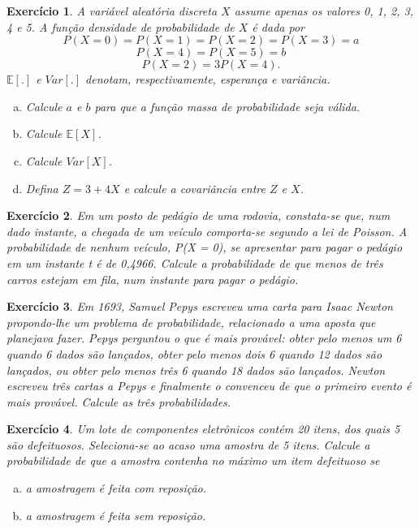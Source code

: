 \documentclass[letter,11pt]{article}
\newtheorem{exer}{Exercício}
\newcommand{\var}{Var}
\newcommand{\E}{\mathbb{E}}
\begin{document}
\medskip
\begin{exer} \rm
A variável aleatória discreta $X$ assume apenas os valores 0, 1, 2, 3, 4 e 5. A função densidade de
probabilidade de $X$ é dada por
\[P (X = 0)=P(X=1)=P(X = 2)= P(X=3)=a\]
\[P(X=4)=P(X=5) = b\]
\[P(X=2)= 3P(X=4).\]
$\E[.]$ e $\var[.]$ denotam, respectivamente, esperança e variância. 
\begin{enumerate}[a)]

\item Calcule $a$ e $b$ para que a função massa de probabilidade seja válida.

\item Calcule $\E[X]$. 

\item Calcule $\var[X]$.

\item  Defina $Z = 3 + 4X$ e calcule a covariância entre $Z$ e $X$.

\end{enumerate}
\end{exer}


\medskip
\begin{exer} \rm %
 Em um posto de pedágio de uma rodovia, constata-se que, num dado instante, a chegada de um veículo comporta-se segundo a lei de Poisson. A probabilidade de nenhum veículo, P(X = 0), se apresentar para pagar o pedágio em um instante t é de 0,4966. Calcule a probabilidade de que menos de três carros estejam em fila, num instante para pagar o pedágio.
\end{exer}




\medskip
\begin{exer} \rm %
Em 1693, Samuel Pepys escreveu uma carta para Isaac Newton propondo-lhe um problema de probabilidade, relacionado a uma aposta que planejava fazer. Pepys perguntou o que é mais provável: obter pelo menos um 6 quando 6 dados são lançados, obter pelo menos dois 6 quando 12 dados são lançados, ou obter pelo menos três 6 quando 18 dados são lançados. Newton escreveu três cartas a Pepys e finalmente o convenceu de que o primeiro evento é mais provável. Calcule as três probabilidades.%
\end{exer}


\medskip
\begin{exer} \rm %
Um lote de componentes eletrônicos contém 20 itens, dos quais 5 são defeituosos. Seleciona-se ao acaso uma amostra de 5 itens. Calcule a probabilidade de que a amostra contenha no máximo um item defeituoso se
\begin{enumerate}[a)]
\item a amostragem é feita com reposição.%
\item a amostragem é feita sem reposição. %
\end{enumerate}
\end{exer}
\end{document}
